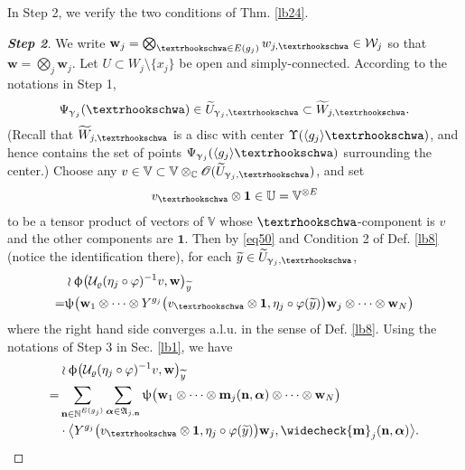 \documentclass[11pt,b5paper,notitlepage]{article}
\theoremstyle{definition}
\theoremstyle{plain}
\newcommand{\fk}{\mathfrak}
\newcommand{\mc}{\mathcal}
\newcommand{\wtd}{\widetilde}
\newcommand{\wch}{\widecheck}
\newcommand{\id}{\mathbf{1}}
\newcommand{\bk}[1]{\langle {#1}\rangle}
\newcommand{\scr}{\mathscr}
\newcommand{\mbf}{\mathbf}
\newcommand{\bsb}{\boldsymbol}
\newcommand{\Vbb}{\mathbb V}
\newcommand{\Ubb}{\mathbb U}
\newcommand{\Cbb}{\mathbb C}
\newcommand{\Nbb}{\mathbb N}
\newcommand{\wbf}{\mathbf w}
\newcommand{\tipae}{\text{\textrhookschwa}}
\numberwithin{equation}{subsection}
\begin{document}
In Step 2, we verify the two conditions of Thm. \ref{lb24}.


\begin{proof}[\textbf{Step 2}]

We write $\wbf_j=\bigotimes_{\tipae\in E(g_j)}w_{j,\tipae}\in\mc W_j$ so that $\wbf=\bigotimes_j\wbf_j$. Let $U\subset W_j\setminus\{x_j\}$ be open and simply-connected. According to the notations in Step 1, 
\begin{align*}
\Psi_{\upgamma_j}(\tipae)\in\wtd U_{\upgamma_j,\tipae}\subset\wtd W_{j,\tipae}.	
\end{align*} 
(Recall that $\wtd W_{j,\tipae}$ is a disc with center $\Upsilon(\bk{g_j}\tipae)$, and hence contains the set of points $\Psi_{\upgamma_j}(\bk{g_j}\tipae)$ surrounding the center.) Choose any $v\in\Vbb\subset\Vbb\otimes_\Cbb\scr O(\wtd U_{\upgamma_j,\tipae})$, and set
\begin{align*}
v_\tipae\otimes\id\in\Ubb=\Vbb^{\otimes E}	
\end{align*}
to be a tensor product of vectors of $\Vbb$ whose $\tipae$-component is $v$ and the other components are $\id$. Then by \eqref{eq50} and Condition 2 of Def. \ref{lb8} (notice the identification there), for each $\wtd y\in\wtd U_{\upgamma_j,\tipae}$,
\begin{align*}
&\wr\upphi\big(\mc U_\varrho(\eta_j\circ\varphi)^{-1}v,\wbf\big)_{\wtd y}\\
=&\uppsi\big(\wbf_1\otimes\cdots\otimes Y^{g_j}\big(v_\tipae\otimes\id,\eta_j\circ\varphi(\wtd y)\big)\wbf_j\otimes\cdots\otimes\wbf_N \big)	
\end{align*}
where the right hand side converges a.l.u. in the sense of Def. \ref{lb8}. Using the notations of Step 3 in Sec. \ref{lb1}, we have
\begin{align*}
&\wr\upphi\big(\mc U_\varrho(\eta_j\circ\varphi)^{-1}v,\wbf\big)_{\wtd y}\\
=&\sum_{\mbf n\in\Nbb^{E(g_j)}}\sum_{\bsb\alpha\in\fk A_{j,\mbf n}}\uppsi\big(\wbf_1\otimes\cdots\otimes \mbf m_j(\mbf n,\bsb\alpha)\otimes\cdots\otimes\wbf_N \big)\nonumber\\
&\cdot \big\langle Y^{g_j}\big(v_\tipae\otimes\id,\eta_j\circ\varphi(\wtd y)\big)\wbf_j,\wch{\mbf m}_j(\mbf n,\bsb\alpha)\big\rangle.	
\end{align*}



\end{proof}
\end{document}
